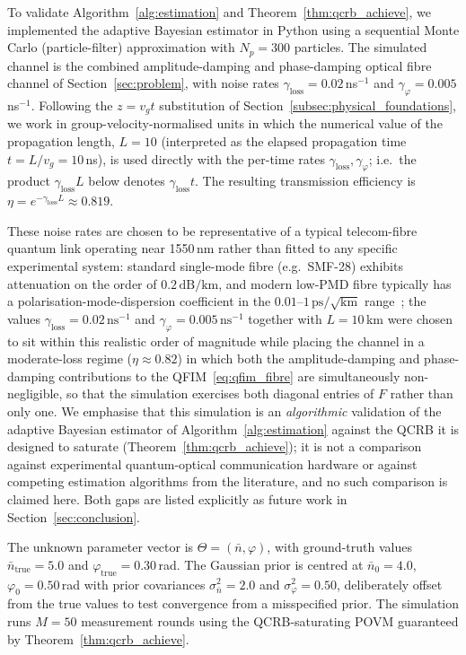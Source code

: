 \documentclass[journal,twocolumn]{IEEEtran}
\theoremstyle{definition}
\theoremstyle{plain}
\begin{document}
To validate Algorithm~\ref{alg:estimation} and
Theorem~\ref{thm:qcrb_achieve}, we implemented the adaptive
Bayesian estimator in Python using a sequential Monte Carlo
(particle-filter) approximation with $N_p = 300$ particles.
The simulated channel is the combined amplitude-damping and
phase-damping optical fibre channel of
Section~\ref{sec:problem}, with noise rates
$\gamma_{\mathrm{loss}} = 0.02$\,ns$^{-1}$ and
$\gamma_\varphi = 0.005$\,ns$^{-1}$.  Following the
$z=v_g t$ substitution of Section~\ref{subsec:physical_foundations},
we work in group-velocity-normalised units in which the numerical
value of the propagation length, $L = 10$ (interpreted as the
elapsed propagation time $t=L/v_g=10$\,ns), is used directly with
the per-time rates $\gamma_{\mathrm{loss}},\gamma_\varphi$; i.e.\ the
product $\gamma_{\mathrm{loss}}L$ below denotes $\gamma_{\mathrm{loss}}t$.
The resulting transmission efficiency
is $\eta = e^{-\gamma_{\mathrm{loss}}L} \approx 0.819$.

These noise rates are chosen to be representative of a typical
telecom-fibre quantum link operating near 1550\,nm rather than
fitted to any specific experimental system: standard single-mode
fibre (e.g.\ SMF-28) exhibits attenuation on the order of
$0.2\,\mathrm{dB/km}$, and modern low-PMD fibre typically has a
polarisation-mode-dispersion coefficient in the
$0.01$--$1\,\mathrm{ps}/\sqrt{\mathrm{km}}$ range~\cite{agrawal2007};
the values $\gamma_{\mathrm{loss}} = 0.02\,\mathrm{ns}^{-1}$ and
$\gamma_\varphi = 0.005\,\mathrm{ns}^{-1}$ together with $L=10$\,km
were chosen to sit within this realistic order of magnitude while
placing the channel in a moderate-loss regime ($\eta\approx 0.82$)
in which both the amplitude-damping and phase-damping contributions
to the QFIM~\eqref{eq:qfim_fibre} are simultaneously non-negligible,
so that the simulation exercises both diagonal entries of $F$ rather
than only one. We emphasise that this simulation is an
\emph{algorithmic} validation of the adaptive Bayesian estimator of
Algorithm~\ref{alg:estimation} against the QCRB it is designed to
saturate (Theorem~\ref{thm:qcrb_achieve}); it is not a comparison
against experimental quantum-optical communication hardware or
against competing estimation algorithms from the literature, and no
such comparison is claimed here. Both gaps are listed explicitly as
future work in Section~\ref{sec:conclusion}.

The unknown parameter vector is
$\Theta = (\bar n,\varphi)$, with ground-truth values
$\bar n_{\mathrm{true}} = 5.0$ and
$\varphi_{\mathrm{true}} = 0.30$\,rad.  The Gaussian prior
is centred at $\bar n_0 = 4.0$, $\varphi_0 = 0.50$\,rad
with prior covariances $\sigma_{\bar n}^2 = 2.0$ and
$\sigma_\varphi^2 = 0.50$, deliberately offset from the
true values to test convergence from a misspecified prior.
The simulation runs $M = 50$ measurement rounds using the
QCRB-saturating POVM guaranteed by
Theorem~\ref{thm:qcrb_achieve}.
\end{document}
